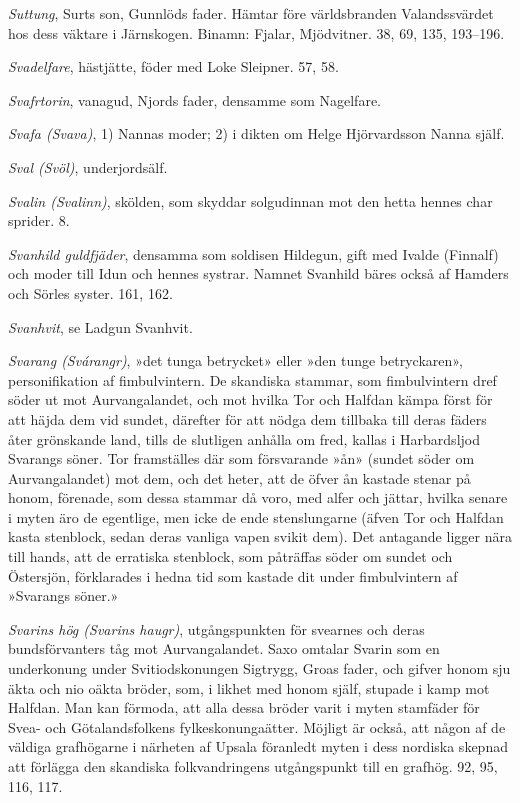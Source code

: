 \emph{Suttung}, Surts son, Gunnlöds fader. Hämtar före världsbranden
Valandssvärdet hos dess väktare i Järnskogen. Binamn: Fjalar,
Mjödvitner. 38, 69, 135, 193--196.

\emph{Svadelfare}, hästjätte, föder med Loke Sleipner. 57, 58.

\emph{Svafrtorin}, vanagud, Njords fader, densamme som Nagelfare.

\emph{Svafa (Svava)}, 1) Nannas moder; 2) i dikten om Helge Hjörvardsson
Nanna själf.

\emph{Sval (Svöl)}, underjordsälf.

\emph{Svalin (Svalinn)}, skölden, som skyddar solgudinnan mot den hetta
hennes char sprider. 8.

\emph{Svanhild guldfjäder}, densamma som soldisen Hildegun, gift med
Ivalde (Finnalf) och moder till Idun och hennes systrar. Namnet Svanhild
bäres också af Hamders och Sörles syster. 161, 162.

\emph{Svanhvit}, se Ladgun Svanhvit.

\emph{Svarang (Svárangr)}, »det tunga betrycket» eller »den tunge
betryckaren», personifikation af fimbulvintern. De skandiska stammar,
som fimbulvintern dref söder ut mot Aurvangalandet, och mot hvilka Tor
och Halfdan kämpa först för att häjda dem vid sundet, därefter för att
nödga dem tillbaka till deras fäders åter grönskande land, tills de
slutligen anhålla om fred, kallas i Harbardsljod Svarangs söner. Tor
framställes där som försvarande »ån» (sundet söder om Aurvangalandet)
mot dem, och det heter, att de öfver ån kastade stenar på honom,
förenade, som dessa stammar då voro, med alfer och jättar, hvilka senare
i myten äro de egentlige, men icke de ende stenslungarne (äfven Tor och
Halfdan kasta stenblock, sedan deras vanliga vapen svikit dem). Det
antagande ligger nära till hands, att de erratiska stenblock, som
påträffas söder om sundet och Östersjön, förklarades i hedna tid som
kastade dit under fimbulvintern af »Svarangs söner.»

\emph{Svarins hög (Svarins haugr)}, utgångspunkten för svearnes och
deras bundsförvanters tåg mot Aurvangalandet. Saxo omtalar Svarin som en
underkonung under Svitiodskonungen Sigtrygg, Groas fader, och gifver
honom sju äkta och nio oäkta bröder, som, i likhet med honom
\protect\hypertarget{lb1625905.xhtmlux5cux23start240}{}{}\protect\hypertarget{lb1625905.xhtmlux5cux23start240-a}{}{}\protect\hypertarget{lb1625905.xhtmlux5cux23start240-b}{}{}\protect\hypertarget{lb1625905.xhtmlux5cux23start240-c}{}{}\protect\hypertarget{lb1625905.xhtmlux5cux23start240-d}{}{}
själf, stupade i kamp mot Halfdan. Man kan förmoda, att alla dessa
bröder varit i myten stamfäder för Svea- och Götalandsfolkens
fylkeskonungaätter. Möjligt är också, att någon af de väldiga
grafhögarne i närheten af Upsala föranledt myten i dess nordiska skepnad
att förlägga den skandiska folkvandringens utgångspunkt till en grafhög.
92, 95, 116, 117.

